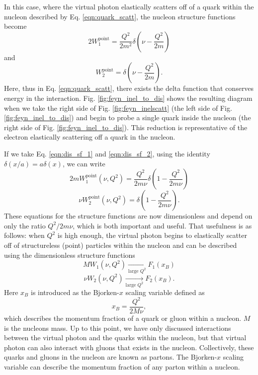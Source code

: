 In this case, where the virtual photon elastically scatters off of a quark within the nucleon described by Eq. \ref{eqn:quark_scatt}, the nucleon structure functions become
\begin{equation}
\label{eqn:dis_sf_1}
2W_1^{\mathrm{point}} = \frac{Q^2}{2m^2} \delta \left( \nu - \frac{Q^2}{2m} \right)
\end{equation}
and
\begin{equation}
\label{eqn:dis_sf_2}
W_2^{\mathrm{point}} = \delta \left( \nu - \frac{Q^2}{2m} \right).
\end{equation}
Here, thus in Eq. \ref{eqn:quark_scatt}, there exists the delta function that conserves energy in the interaction. Fig. \ref{fig:feyn_inel_to_dis} shows the resulting diagram when we take the right side of Fig. \ref{fig:feyn_inelscatt} (the left side of Fig. \ref{fig:feyn_inel_to_dis}) and begin to probe a single quark inside the nucleon (the right side of Fig. \ref{fig:feyn_inel_to_dis}). This reduction is representative of the electron elastically scattering off a quark in the nucleon.

If we take Eq. \ref{eqn:dis_sf_1} and \ref{eqn:dis_sf_2}, using the identity $\delta(x/a) = a\delta(x)$, we can write
\begin{equation}
\nonumber
2mW_1^{\mathrm{point}}(\nu,Q^2) = \frac{Q^2}{2m\nu} \delta \left( 1- \frac{Q^2}{2m\nu} \right)
\end{equation}
\begin{equation}
\nu W_2^{\mathrm{point}}(\nu,Q^2) = \delta \left( 1- \frac{Q^2}{2m\nu} \right).
\end{equation}
These equations for the structure functions are now dimensionless and depend on only the ratio $Q^2/2m\nu$, which is both important and useful. That usefulness is as follows: when $Q^2$ is high enough, the virtual photon begins to elastically scatter off of structureless (point) particles  within the nucleon and can be described using the dimensionless structure functions
\begin{equation}
\nonumber
MW_1(\nu,Q^2) \xrightarrow[\text{large $Q^2$}]{} F_1(x_B)
\end{equation}
\begin{equation}
\nu W_2(\nu,Q^2) \xrightarrow[\text{large $Q^2$}]{} F_2(x_B).
\end{equation}
Here $x_B$ is introduced as the Bjorken-$x$ scaling variable defined as
\begin{equation}
x_B = \frac{Q^2}{2M\nu},
\end{equation}
which describes the momentum fraction of a quark or gluon within a nucleon. $M$ is the nucleons mass. Up to this point, we have only discussed interactions between the virtual photon and the quarks within the nucleon, but that virtual photon can also interact with gluons that exists in the nucleon. Collectively, these quarks and gluons in the nucleon are known as partons. The Bjorken-$x$ scaling variable can describe the momentum fraction of any parton within a nucleon.

